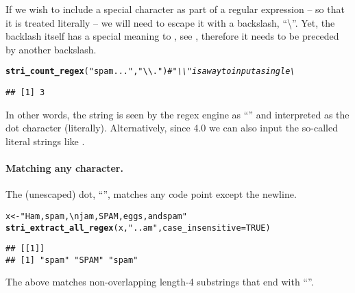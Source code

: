 \documentclass[nojss]{jss}\usepackage[]{graphicx}\usepackage[]{xcolor}
\makeatletter
\newcommand{\hlnum}[1]{\textcolor[rgb]{0.686,0.059,0.569}{#1}}%
\newcommand{\hlstr}[1]{\textcolor[rgb]{0.192,0.494,0.8}{#1}}%
\newcommand{\hlcom}[1]{\textcolor[rgb]{0.678,0.584,0.686}{\textit{#1}}}%
\newcommand{\hlstd}[1]{\textcolor[rgb]{0.345,0.345,0.345}{#1}}%
\newcommand{\hlkwb}[1]{\textcolor[rgb]{0.69,0.353,0.396}{#1}}%
\newcommand{\hlkwc}[1]{\textcolor[rgb]{0.333,0.667,0.333}{#1}}%
\newcommand{\hlkwd}[1]{\textcolor[rgb]{0.737,0.353,0.396}{\textbf{#1}}}%
\newenvironment{kframe}{%
 \def\at@end@of@kframe{}%
 \ifinner\ifhmode%
  \def\at@end@of@kframe{\end{minipage}}%
  \begin{minipage}{\columnwidth}%
 \fi\fi%
 \def\FrameCommand##1{\hskip\@totalleftmargin \hskip-\fboxsep
 \colorbox{shadecolor}{##1}\hskip-\fboxsep
     \hskip-\linewidth \hskip-\@totalleftmargin \hskip\columnwidth}%
 \MakeFramed {\advance\hsize-\width
   \@totalleftmargin\z@ \linewidth\hsize
   \@setminipage}}%
 {\par\unskip\endMakeFramed%
 \at@end@of@kframe}
\newenvironment{knitrout}{}{} %
\makeatother
\begin{document}
If we wish to include a special character as part of a regular expression --
so that it is treated literally -- we will need to escape it with  a backslash,
``\textbackslash''. Yet, the backlash itself
has a special meaning to , see ,
therefore it needs to be preceded by another backslash.

\begin{knitrout}
\color{fgcolor}\begin{kframe}
\begin{alltt}
\hlkwd{stri_count_regex}\hlstd{(}\hlstr{"spam..."}\hlstd{,} \hlstr{"\textbackslash{}\textbackslash{}."}\hlstd{)}   \hlcom{# "\textbackslash{}\textbackslash{}" is a way to input a single \textbackslash{}}
\end{alltt}
\begin{verbatim}
## [1] 3
\end{verbatim}
\end{kframe}
\end{knitrout}

In other words, the  string 
is seen by the regex engine as ``'' and interpreted
as the dot character (literally). Alternatively,
since  4.0 we can also input the so-called literal strings
like .


\paragraph{Matching any character.}
The (unescaped) dot, ``'', matches any code point except the newline.

\begin{knitrout}
\color{fgcolor}\begin{kframe}
\begin{alltt}
\hlstd{x} \hlkwb{<-} \hlstr{"Ham, spam,\textbackslash{}njam, SPAM, eggs, and spam"}
\hlkwd{stri_extract_all_regex}\hlstd{(x,} \hlstr{"..am"}\hlstd{,} \hlkwc{case_insensitive}\hlstd{=}\hlnum{TRUE}\hlstd{)}
\end{alltt}
\begin{verbatim}
## [[1]]
## [1] "spam" "SPAM" "spam"
\end{verbatim}
\end{kframe}
\end{knitrout}

The above matches non-overlapping length-4 substrings that
end with ``''.
\end{document}
